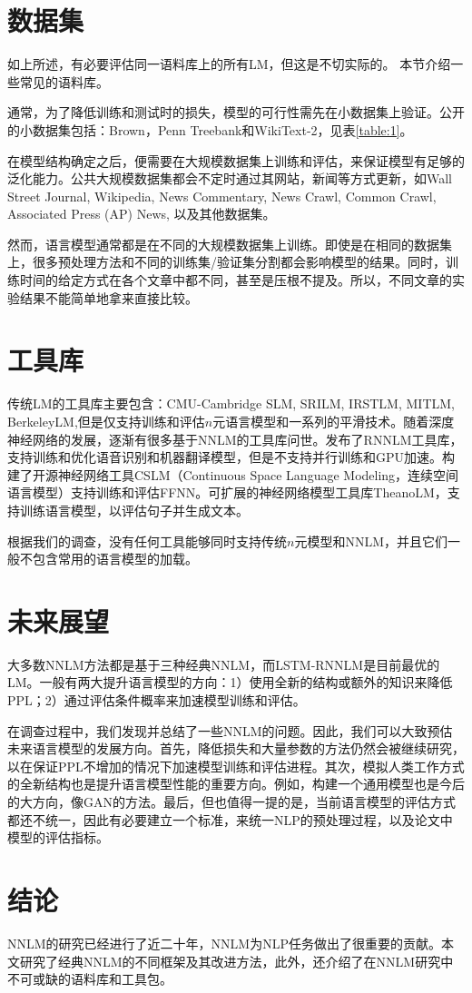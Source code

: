 \documentclass[a4paper, 12pt, twocolumn]{article}
\begin{document}
\section{数据集}\label{sec:4}
如上所述，有必要评估同一语料库上的所有LM，但这是不切实际的。 本节介绍一些常见的语料库。

通常，为了降低训练和测试时的损失，模型的可行性需先在小数据集上验证。公开的小数据集包括：Brown，Penn Treebank和WikiText-2，见表\ref{table:1}。

在模型结构确定之后，便需要在大规模数据集上训练和评估，来保证模型有足够的泛化能力。公共大规模数据集都会不定时通过其网站，新闻等方式更新，如Wall Street Journal, Wikipedia, News Commentary, News Crawl, Common Crawl, Associated Press (AP) News, 以及其他数据集。

然而，语言模型通常都是在不同的大规模数据集上训练。即使是在相同的数据集上，很多预处理方法和不同的训练集/验证集分割都会影响模型的结果。同时，训练时间的给定方式在各个文章中都不同，甚至是压根不提及。所以，不同文章的实验结果不能简单地拿来直接比较。
\section{工具库}\label{sec:5}
传统LM的工具库主要包含：CMU-Cambridge SLM, SRILM, IRSTLM, MITLM, BerkeleyLM,但是仅支持训练和评估$n$元语言模型和一系列的平滑技术。随着深度神经网络的发展，逐渐有很多基于NNLM的工具库问世。\cite{mikolov2010recurrent}发布了RNNLM工具库，支持训练和优化语音识别和机器翻译模型，但是不支持并行训练和GPU加速。\cite{schwenk2013cslm}构建了开源神经网络工具CSLM（Continuous Space Language Modeling，连续空间语言模型）支持训练和评估FFNN。可扩展的神经网络模型工具库TheanoLM\cite{enarvi2016theanolm}，支持训练语言模型，以评估句子并生成文本。

根据我们的调查，没有任何工具能够同时支持传统$n$元模型和NNLM，并且它们一般不包含常用的语言模型的加载。
\section{未来展望}\label{sec:7}
大多数NNLM方法都是基于三种经典NNLM，而LSTM-RNNLM是目前最优的LM。一般有两大提升语言模型的方向：1）使用全新的结构或额外的知识来降低PPL；2）通过评估条件概率来加速模型训练和评估。

在调查过程中，我们发现并总结了一些NNLM的问题。因此，我们可以大致预估未来语言模型的发展方向。首先，降低损失和大量参数的方法仍然会被继续研究，以在保证PPL不增加的情况下加速模型训练和评估进程。其次，模拟人类工作方式的全新结构也是提升语言模型性能的重要方向。例如，构建一个通用模型也是今后的大方向，像GAN的方法。最后，但也值得一提的是，当前语言模型的评估方式都还不统一，因此有必要建立一个标准，来统一NLP的预处理过程，以及论文中模型的评估指标。
\section{结论}\label{sec:7}
NNLM的研究已经进行了近二十年，NNLM为NLP任务做出了很重要的贡献。本文研究了经典NNLM的不同框架及其改进方法，此外，还介绍了在NNLM研究中不可或缺的语料库和工具包。

  
  
\end{document}
